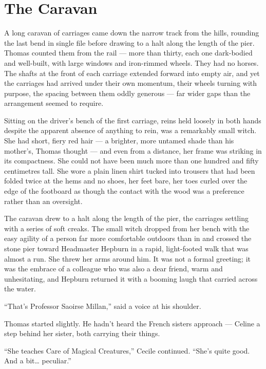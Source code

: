 
\chapter{The Caravan}
 
A long caravan of carriages came down the narrow track from the hills, rounding the last bend in single file before drawing to a halt along the length of the pier. Thomas counted them from the rail --- more than thirty, each one dark-bodied and well-built, with large windows and iron-rimmed wheels. They had no horses. The shafts at the front of each carriage extended forward into empty air, and yet the carriages had arrived under their own momentum, their wheels turning with purpose, the spacing between them oddly generous --- far wider gaps than the arrangement seemed to require.
 
Sitting on the driver's bench of the first carriage, reins held loosely in both hands despite the apparent absence of anything to rein, was a remarkably small witch. She had short, fiery red hair --- a brighter, more untamed shade than his mother's, Thomas thought --- and even from a distance, her frame was striking in its compactness. She could not have been much more than one hundred and fifty centimetres tall. She wore a plain linen shirt tucked into trousers that had been folded twice at the hems and no shoes, her feet bare, her toes curled over the edge of the footboard as though the contact with the wood was a preference rather than an oversight.
 
The caravan drew to a halt along the length of the pier, the carriages settling with a series of soft creaks. The small witch dropped from her bench with the easy agility of a person far more comfortable outdoors than in and crossed the stone pier toward Headmaster Hepburn in a rapid, light-footed walk that was almost a run. She threw her arms around him. It was not a formal greeting; it was the embrace of a colleague who was also a dear friend, warm and unhesitating, and Hepburn returned it with a booming laugh that carried across the water.
 
\enquote{That's Professor Saoirse Millan,} said a voice at his shoulder.
 
Thomas started slightly. He hadn't heard the French sisters approach --- Celine a step behind her sister, both carrying their things.
 
\enquote{She teaches Care of Magical Creatures,} Cecile continued. \enquote{She's quite good. And a bit\ldots{} peculiar.}
 
